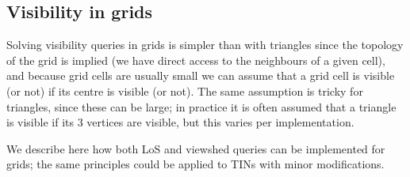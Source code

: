 %
\subsection{Visibility in grids}

Solving visibility queries in grids is simpler than with triangles since the topology of the grid is implied (we have direct access to the neighbours of a given cell), and because grid cells are usually small we can assume that a grid cell is visible (or not) if its centre is visible (or not).
The same assumption is tricky for triangles, since these can be large; in practice it is often assumed that a triangle is visible if its 3 vertices are visible, but this varies per implementation.

%

We describe here how both LoS and viewshed queries can be implemented for grids; the same principles could be applied to TINs with minor modifications.


